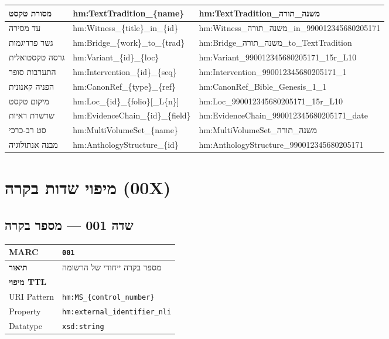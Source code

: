 \documentclass[12pt,a4paper]{article}
\newcommand{\marcfield}[1]{\texttt{#1}}
\newcommand{\ttlprop}[1]{\texttt{#1}}
\begin{document}
\begin{longtable}{|p{2cm}|L{4cm}|L{10cm}|}
\hline
מסורת טקסט & hm:TextTradition\_\{name\} & hm:TextTradition\_משנה\_תורה \\
\hline
עד מסירה & hm:Witness\_\{title\}\_in\_\{id\} & hm:Witness\_משנה\_תורה\_in\_990012345680205171 \\
\hline
גשר פרדיגמות & hm:Bridge\_\{work\}\_to\_\{trad\} & hm:Bridge\_משנה\_תורה\_to\_TextTradition \\
\hline
גרסה טקסטואלית & hm:Variant\_\{id\}\_\{loc\} & hm:Variant\_990012345680205171\_15r\_L10 \\
\hline
התערבות סופר & hm:Intervention\_\{id\}\_\{seq\} & hm:Intervention\_990012345680205171\_1 \\
\hline
הפניה קאנונית & hm:CanonRef\_\{type\}\_\{ref\} & hm:CanonRef\_Bible\_Genesis\_1\_1 \\
\hline
מיקום טקסט & hm:Loc\_\{id\}\_\{folio\}[\_L\{n\}] & hm:Loc\_990012345680205171\_15r\_L10 \\
\hline
שרשרת ראיות & hm:EvidenceChain\_\{id\}\_\{field\} & hm:EvidenceChain\_990012345680205171\_date \\
\hline
סט רב-כרכי & hm:MultiVolumeSet\_\{name\} & hm:MultiVolumeSet\_משנה\_תורה \\
\hline
מבנה אנתולוגיה & hm:AnthologyStructure\_\{id\} & hm:AnthologyStructure\_990012345680205171 \\
\hline
\end{longtable}

\newpage
\section{מיפוי שדות בקרה \textenglish{(00X)}}

\subsection{שדה 001 — מספר בקרה}

\begin{longtable}{|L{4cm}|L{12cm}|}
\hline
\textbf{MARC} & \marcfield{001} \\
\hline
\textbf{תיאור} & מספר בקרה ייחודי של הרשומה \\
\hline
\textbf{מיפוי TTL} & \\
\hline
\textenglish{URI Pattern} & \ttlprop{hm:MS\_\{control\_number\}} \\
\hline
\textenglish{Property} & \ttlprop{hm:external\_identifier\_nli} \\
\hline
\textenglish{Datatype} & \ttlprop{xsd:string} \\
\hline
\end{longtable}
\end{document}
